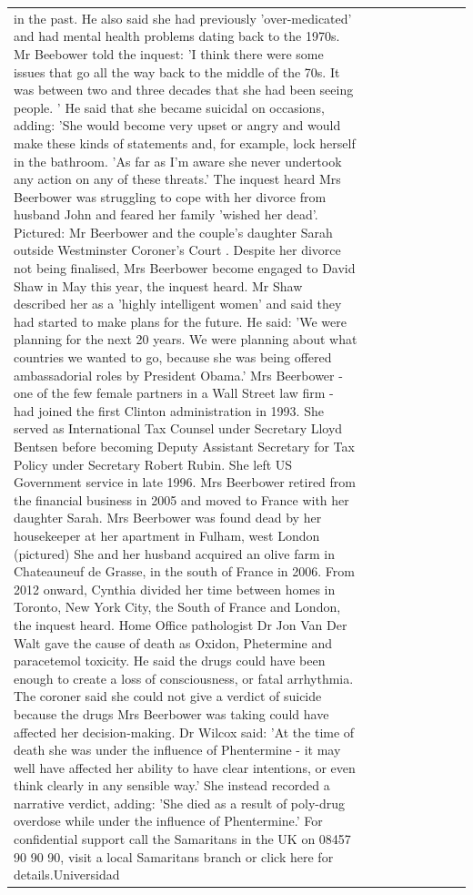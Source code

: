 \begin{table}[H]
\begin{tabular}{lllrlllll}
in the past. He also said she had previously 'over-medicated' and had mental health problems dating back to the 1970s. Mr Beebower told the inquest: 'I think there were some issues that go all the way back to the middle of the 70s. It was between two and three decades that she had been seeing people. ' He said that she became suicidal on occasions, adding: 'She would become very upset or angry and would make these kinds of statements and, for example, lock herself in the bathroom. 'As far as I'm aware she never undertook any action on any of these threats.' The inquest heard Mrs Beerbower was struggling to cope with her divorce from husband John and feared her family 'wished her dead'. Pictured: Mr Beerbower and the couple's daughter Sarah outside Westminster Coroner's Court . Despite her divorce not being finalised, Mrs Beerbower become engaged to David Shaw in May this year, the inquest heard. Mr Shaw described her as a 'highly intelligent women' and said they had started to make plans for the future. He said: 'We were planning for the next 20 years. We were planning about what countries we wanted to go, because she was being offered ambassadorial roles by President Obama.' Mrs Beerbower - one of the few female partners in a Wall Street law firm - had joined the first Clinton administration in 1993. She served as International Tax Counsel under Secretary Lloyd Bentsen before becoming Deputy Assistant Secretary for Tax Policy under Secretary Robert Rubin. She left US Government service in late 1996. Mrs Beerbower retired from the financial business in 2005 and moved to France with her daughter Sarah. Mrs Beerbower was found dead by her housekeeper at her apartment in Fulham, west London (pictured) She and her husband acquired an olive farm in Chateauneuf de Grasse, in the south of France in 2006. From 2012 onward, Cynthia divided her time between homes in Toronto, New York City, the South of France and London, the inquest heard. Home Office pathologist Dr Jon Van Der Walt gave the cause of death as Oxidon, Phetermine and paracetemol toxicity. He said the drugs could have been enough to create a loss of consciousness, or fatal arrhythmia. The coroner said she could not give a verdict of suicide because the drugs Mrs Beerbower was taking could have affected her decision-making. Dr Wilcox said: 'At the time of death she was under the influence of Phentermine - it may well have affected her ability to have clear intentions, or even think clearly in any sensible way.' She instead recorded a narrative verdict, adding: 'She died as a result of poly-drug overdose while under the influence of Phentermine.' For confidential support call the Samaritans in the UK on 08457 90 90 90, visit a local Samaritans branch or click here for details.Universidad \\

\end{tabular}
\end{table}
